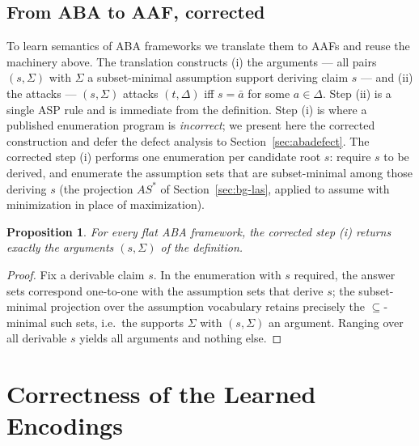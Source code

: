 \documentclass[review,12pt]{elsarticle}
\newtheorem{proposition}{Proposition}
\theoremstyle{definition}
\theoremstyle{remark}
\newcommand{\pred}[1]{\textsf{#1}}
\newcommand{\ASstar}{\mathit{AS}^{*}}
\begin{document}
\subsection{From ABA to AAF, corrected}
\label{sec:abatranslation}

To learn semantics of ABA frameworks we translate them to AAFs and reuse the
machinery above. The translation constructs (i) the arguments --- all pairs
$(s,\Sigma)$ with $\Sigma$ a subset-minimal assumption support deriving claim
$s$ --- and (ii) the attacks --- $(s,\Sigma)$ attacks $(t,\Delta)$ iff
$s=\bar a$ for some $a\in\Delta$. Step (ii) is a single ASP rule and is
immediate from the definition. Step (i) is where a published enumeration
program is \emph{incorrect}; we present here the corrected construction and
defer the defect analysis to Section~\ref{sec:abadefect}. The corrected
step (i) performs one enumeration per candidate root $s$: require $s$ to be
derived, and enumerate the assumption sets that are subset-minimal among those
deriving $s$ (the projection $\ASstar$ of Section~\ref{sec:bg-las}, applied to
\pred{assume} with minimization in place of maximization).

\begin{proposition}
\label{prop:aba}
For every flat ABA framework, the corrected step (i) returns exactly the
arguments $(s,\Sigma)$ of the definition.
\end{proposition}

\begin{proof}
Fix a derivable claim $s$. In the enumeration with $s$ required, the answer
sets correspond one-to-one with the assumption sets that derive $s$; the
subset-minimal projection over the assumption vocabulary retains precisely
the $\subseteq$-minimal such sets, i.e.\ the supports $\Sigma$ with
$(s,\Sigma)$ an argument. Ranging over all derivable $s$ yields all
arguments and nothing else.
\end{proof}

\section{Correctness of the Learned Encodings}
\label{sec:mech}
\end{document}
